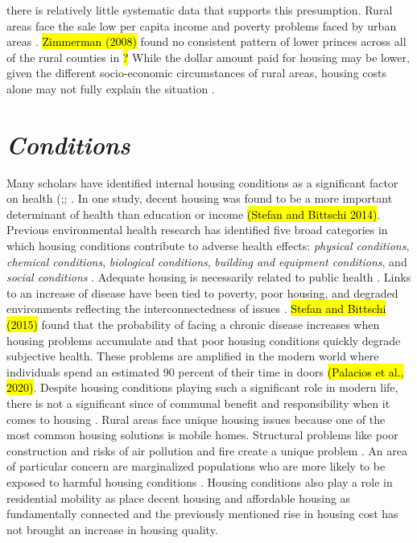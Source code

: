 there is relatively little systematic data that supports this presumption. Rural areas face the sale low per capita income and poverty problems faced by urban areas \citep{castle_place_2011}. \hl{Zimmerman (2008)} found no consistent pattern of lower princes across all of the rural counties in \hl{?} While the dollar amount paid for housing may be lower, given the different socio-economic circumstances of rural areas, housing costs alone may not fully explain the situation \citep{kropczynski_insights_2012}. 

\section{\textit{Conditions}}

Many scholars have identified internal housing conditions as a significant factor on health (\citealp{braveman_housing_2011};\citealp{metzger_fair_2017}; \citealp{swope_housing_2020}. In one study, decent housing was found to be a more important determinant of health than education or income \hl{(Stefan and Bittschi 2014)}. Previous environmental health research has identified five broad categories in which housing conditions contribute to adverse health effects: \textit{physical conditions}, \textit{chemical conditions}, \textit{biological conditions}, \textit{building and equipment conditions}, and \textit{social conditions} \citep{jacobs_environmental_2011}. Adequate housing is necessarily related to public health \citep{matte_housing_2000}. Links to an increase of disease have been tied to poverty, poor housing, and degraded environments reflecting the interconnectedness of \hs issues \citep{rauh_housing_2008}. \hl{Stefan and Bittschi (2015)} found that the probability of facing a chronic disease increases when housing problems accumulate and that poor housing conditions quickly degrade subjective health. These problems are amplified in the modern world where individuals spend an estimated 90 percent of their time in doors \hl{(Palacios et al., 2020)}. Despite housing conditions playing such a significant role in modern life, there is not a significant since of communal benefit and responsibility when it comes to housing \citep{jacobs_environmental_2011}. Rural areas face unique housing issues because one of the most common housing solutions is mobile homes. Structural problems like poor construction and risks of air pollution and fire create a unique problem \citep{mactavish_policy_2006}. An area of particular concern are marginalized populations who are more likely to be exposed to harmful housing conditions \citep{swope_housing_2020}. Housing conditions also play a role in residential mobility as \citet{desmond_housing_2015} place decent housing and affordable housing as fundamentally connected and the previously mentioned rise in housing cost has not brought an increase in housing quality.  

